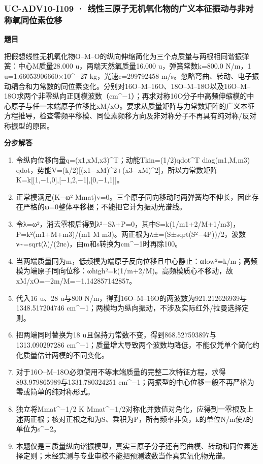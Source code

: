 \documentclass[UTF8,11pt,a4paper]{ctexart}
\begin{document}
\subsubsection*{UC-ADV10-I109 · 线性三原子无机氧化物的广义本征振动与非对称氧同位素位移}
\noindent\textbf{题目}\par
把假想线性无机氧化物O–M–O的纵向伸缩简化为三个点质量与两根相同谐振弹簧：中心M质量28.000 u，两端天然氧质量16.000 u，弹簧常数k=800.0 N/m，1 u=1.66053906660×10\textasciicircum{}−27 kg，光速c=299792458 m/s。忽略弯曲、转动、电子振动耦合和力常数的同位素变化。分别对16O–M–16O、18O–M–18O以及16O–M–18O求两个非零纵向正则模波数（cm\textasciicircum{}−1）；再求对称16O分子中高频伸缩模的中心原子与任一末端原子位移比xM/xO。要求从质量矩阵与力常数矩阵的广义本征方程推导，检查零频平移模、同位素频移方向及非对称分子不再具有纯对称/反对称振型的原因。\par
\medskip\noindent\textbf{分步解答}
\begin{enumerate}
\item 令纵向位移向量q=(x1,xM,x3)\textasciicircum{}T；动能Tkin=(1/2)qdot\textasciicircum{}T diag(m1,M,m3) qdot，势能V=(k/2)[(x1−xM)\textasciicircum{}2+(x3−xM)\textasciicircum{}2]，所以力常数矩阵K=k[[1,−1,0],[−1,2,−1],[0,−1,1]]。
\item 正常模满足(K−ω² Mmat)v=0。三个原子同向移动时两弹簧均不伸长，因此存在严格的ω=0整体平移根；不能把它计为振动光谱线。
\item 令λ=ω²，消去零根后得到λ²−Sλ+P=0，其中S=k(1/m1+2/M+1/m3)，P=k²(m1+M+m3)/(m1 M m3)。两正根为λ±=(S±sqrt(S²−4P))/2，波数ν\textasciitilde{}=sqrt(λ)/(2πc)，由m和s转换为cm\textasciicircum{}−1时再除100。
\item 当两端质量同为m，低频模为端原子反向位移且中心静止：ωlow²=k/m；高频模为端原子同向位移：ωhigh²=k(1/m+2/M)。高频模质心不移动，故xM/xO=−2m/M=−1.142857142857。
\item 代入16 u、28 u与800 N/m，得到16O–M–16O的两波数为921.212626939与1348.517204746 cm\textasciicircum{}−1；两模均为纵向振动，不涉及实际红外/拉曼选择定则。
\item 把两端同时替换为18 u且保持力常数不变，得到868.527593897与1313.090297286 cm\textasciicircum{}−1；质量增大导致两个波数均降低，不能仅凭单个简化约化质量估计两模的不同变化。
\item 对于16O–M–18O必须使用不等末端质量的完整二次特征方程，求得893.979865989与1331.780324251 cm\textasciicircum{}−1；两振型的中心位移一般不再严格为零或简单的纯对称形式。
\item 独立将Mmat\textasciicircum{}−1/2 K Mmat\textasciicircum{}−1/2对称化并数值对角化，应得到一零根及上述两正根；核对正根之和为S、乘积为P，所有频率非负，k的单位N/m使λ的单位为s\textasciicircum{}−2。
\item 本题仅是三质量纵向谐振模型，真实三原子分子还有弯曲模、转动和同位素选择定则；未经实测与专业审校不能把预测波数当作真实氧化物光谱。
\end{enumerate}
\end{document}
